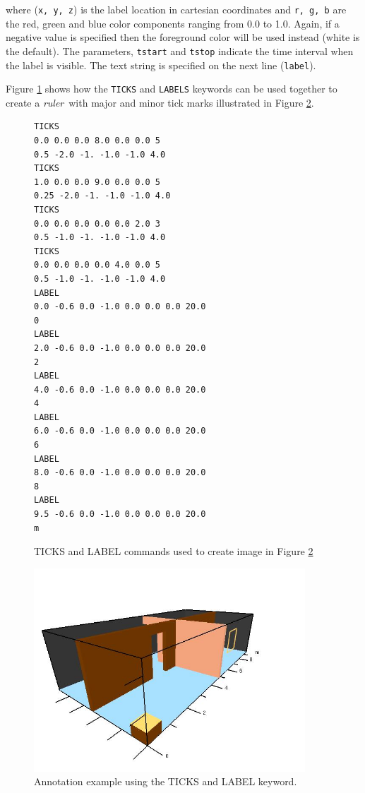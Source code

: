 \documentclass[11pt,twoside]{book}
\newcommand{\figoptions}{hbp}
\begin{document}
\noindent where ({\tt x, y, z}) is the label location in cartesian
coordinates and {\tt r, g, b} are the red, green and blue color
components ranging from 0.0 to 1.0.  Again, if a negative value is
specified then the foreground color will be used instead (white is
the default).  The parameters, {\tt tstart} and {\tt tstop}
indicate the time interval when the label is visible. The text
string is specified on the next line ({\tt label}).

Figure \ref{figticklabels} shows how the {\tt TICKS} and
{\tt LABELS} keywords can be used together to create a
{\em ruler}\ with major and minor tick marks illustrated in Figure
\ref{figticklabelexample}.

\begin{figure}[\figoptions]
{\small
\begin{verbatim}
TICKS
0.0 0.0 0.0 8.0 0.0 0.0 5
0.5 -2.0 -1. -1.0 -1.0 4.0
TICKS
1.0 0.0 0.0 9.0 0.0 0.0 5
0.25 -2.0 -1. -1.0 -1.0 4.0
TICKS
0.0 0.0 0.0 0.0 0.0 2.0 3
0.5 -1.0 -1. -1.0 -1.0 4.0
TICKS
0.0 0.0 0.0 0.0 4.0 0.0 5
0.5 -1.0 -1. -1.0 -1.0 4.0
LABEL
0.0 -0.6 0.0 -1.0 0.0 0.0 0.0 20.0
0
LABEL
2.0 -0.6 0.0 -1.0 0.0 0.0 0.0 20.0
2
LABEL
4.0 -0.6 0.0 -1.0 0.0 0.0 0.0 20.0
4
LABEL
6.0 -0.6 0.0 -1.0 0.0 0.0 0.0 20.0
6
LABEL
8.0 -0.6 0.0 -1.0 0.0 0.0 0.0 20.0
8
LABEL
9.5 -0.6 0.0 -1.0 0.0 0.0 0.0 20.0
m
\end{verbatim}
}
\caption{ TICKS and LABEL commands used to create image in Figure \ref{figticklabelexample}}
\label{figticklabels}%
\end{figure}

\begin{figure}[\figoptions]
\begin{center}
\includegraphics[height=3.0in]{figures/ticklabels}
\end{center}
\caption{ Annotation example using the TICKS and LABEL keyword. }
\label{figticklabelexample}%
\end{figure}
\end{document}
